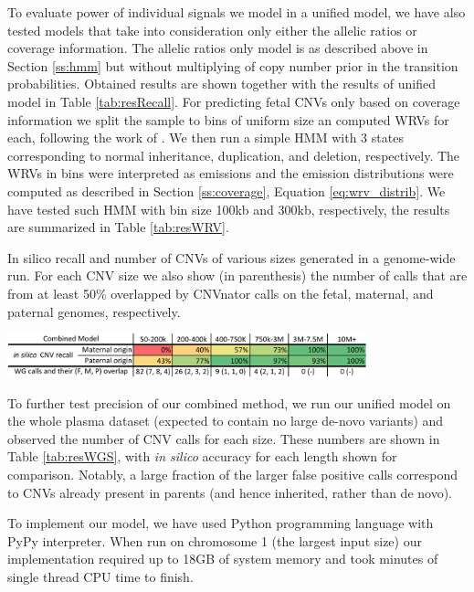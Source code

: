 To evaluate power of individual signals we model in a unified model, we have also tested models that take into consideration only either the allelic ratios or coverage information. The allelic ratios only model is as described above in Section \ref{ss:hmm} but without multiplying of copy number prior in the transition probabilities. Obtained results are shown together with the results of unified model in Table \ref{tab:resRecall}. 
For predicting fetal CNVs only based on coverage information we split the sample to bins of uniform size an computed WRVs for each, following the work of \cite{srinivasan2013}. We then run a simple HMM with 3 states corresponding to normal inheritance, duplication, and deletion, respectively. The WRVs in bins were interpreted as emissions and the emission distributions were computed as described in Section \ref{ss:coverage}, Equation \ref{eq:wrv_distrib}. We have tested such HMM with bin size 100kb and 300kb, respectively, the results are summarized in Table \ref{tab:resWRV}.

\begin{table}
\caption{In silico recall and number of CNVs of various sizes generated in a genome-wide run. For each CNV size we also show (in parenthesis) the number of calls that are from at least 50\% overlapped by CNVnator \citep{abyzov2011cnvnator} calls on the fetal, maternal, and paternal genomes, respectively.}
\label{tab:resWGS}
\centering
\includegraphics[width=0.78\textwidth]{figures/wg_calls_color}
\end{table}

To further test precision of our combined method, we run our unified model on the whole plasma dataset (expected to contain no large de-novo variants) and observed the number of CNV calls for each size. These numbers are shown in Table \ref{tab:resWGS}, with \textit{in silico} accuracy for each length shown for comparison. Notably, a large fraction of the larger false positive calls correspond to CNVs already present in parents (and hence inherited, rather than de novo). 

To implement our model, we have used Python programming language with PyPy interpreter. When run on chromosome 1 (the largest input size) our implementation required up to 18GB of system memory and took  minutes of single thread CPU time to finish.
